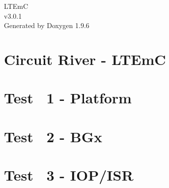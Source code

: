 \documentclass[twoside]{book}
\newcommand{\+}{\discretionary{\mbox{\scriptsize$\hookleftarrow$}}{}{}}
\newcommand{\clearemptydoublepage}{%
    \newpage{\pagestyle{empty}\cleardoublepage}%
  }
\begin{document}
  \raggedbottom
    \hypersetup{pageanchor=false,
                bookmarksnumbered=true,
                pdfencoding=unicode
               }
  \begin{titlepage}
  \vspace*{7cm}
  \begin{center}%
  {\Large LTEmC}\\
  [1ex]\large v3.\+0.\+1 \\
  \vspace*{1cm}
  {\large Generated by Doxygen 1.9.6}\\
  \end{center}
  \end{titlepage}
  \clearemptydoublepage
  \tableofcontents
  \clearemptydoublepage
  \hypersetup{pageanchor=true}
\chapter{Circuit River -\/ LTEmC}
\label{index}\hypertarget{index}{}
\chapter{Test ~1 -\/ Platform}
\label{md__c___users__greg_terrell__documents__code_dev__arduino_libraries__loo_u_q__l_t_em_c_tests_ltemc_01_platform__r_e_a_d_m_e}

\chapter{Test ~2 -\/ BGx}
\label{md__c___users__greg_terrell__documents__code_dev__arduino_libraries__loo_u_q__l_t_em_c_tests_ltemc_02_bgx__r_e_a_d_m_e}

\chapter{Test ~3 -\/ IOP/\+ISR}
\label{md__c___users__greg_terrell__documents__code_dev__arduino_libraries__loo_u_q__l_t_em_c_tests_ltemc_03_iopisr__r_e_a_d_m_e}

\end{document}
